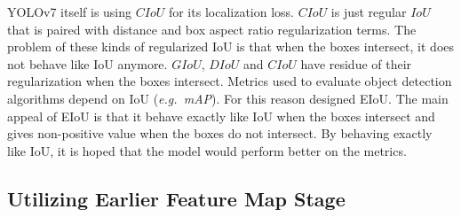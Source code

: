   YOLOv7 itself is using $CIoU$ for its localization loss. $CIoU$ is just regular $IoU$
  that is paired with distance and box aspect ratio regularization terms.
  The problem of these kinds of regularized IoU is that when the boxes intersect, it does not
  behave like IoU anymore. $GIoU$, $DIoU$ and $CIoU$ have residue of their regularization when
  the boxes intersect. Metrics used to evaluate object detection
  algorithms depend on IoU (\textit{e.g.\ mAP}).
  For this reason \textcite{eiou} designed EIoU. The main appeal of EIoU
  is that it behave exactly like IoU when the boxes intersect and gives non-positive value when the
  boxes do not intersect.
  By behaving exactly like IoU, it is hoped that the model would perform better on the metrics.




  \subsection{Utilizing Earlier Feature Map Stage}

